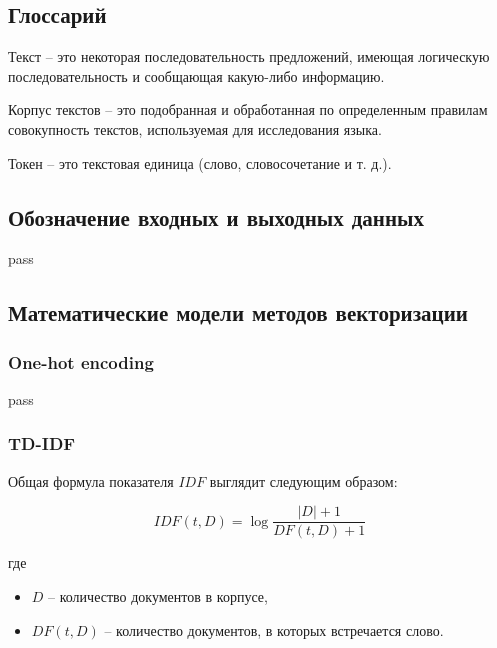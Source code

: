 \documentclass[14pt, a4paper, titlepage]{extarticle}
\begin{document}
        \subsection{Глоссарий}
            Текст
            -- это некоторая последовательность предложений,
            имеющая логическую последовательность и сообщающая
            какую-либо информацию.

            Корпус текстов
            -- это подобранная и обработанная по определенным
            правилам совокупность текстов, используемая для
            исследования языка.

            Токен
            -- это текстовая единица (слово, словосочетание
            и т. д.).

        \newpage

        \subsection{Обозначение входных и выходных данных}
            pass

        \newpage

        \subsection{Математические модели методов векторизации}
            \subsubsection{One-hot encoding}
                pass

            \subsubsection{TD-IDF}
                Общая формула показателя $IDF$ выглядит
                следующим образом:

                \begin{equation*}
                    IDF(t, D) = \log{
                        \frac{|D| + 1}{DF(t, D) + 1}
                    }
                \end{equation*}

                где

                \begin{itemize}
                    \item $D$
                    -- количество документов в корпусе,
                    \item $DF(t, D)$
                    -- количество документов, в которых
                    встречается слово.
                \end{itemize}
\end{document}
